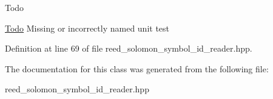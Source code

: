 \begin{DoxyRefDesc}{Todo}
\item[\hyperlink{todo__todo000045}{Todo}]Missing or incorrectly named unit test\end{DoxyRefDesc}


Definition at line 69 of file reed\-\_\-solomon\-\_\-symbol\-\_\-id\-\_\-reader.\-hpp.



The documentation for this class was generated from the following file\-:\begin{DoxyCompactItemize}
\item 
reed\-\_\-solomon\-\_\-symbol\-\_\-id\-\_\-reader.\-hpp\end{DoxyCompactItemize}
